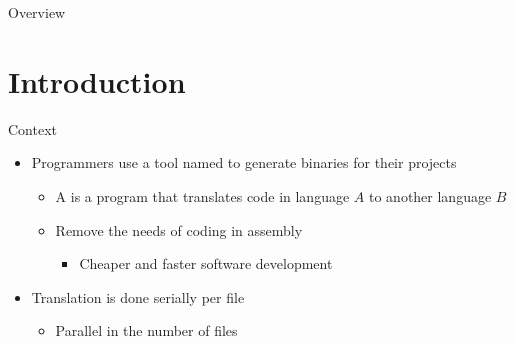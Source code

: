 

\customtitlepage

\showqrcode

\begin{frame}{Overview}
  \overview
\end{frame}

\section{Introduction}

\begin{frame}{Context}
  \begin{itemize}
    \item Programmers use a tool named {\color{red}{compiler}} to generate binaries for their projects
    \begin{itemize}
      \item A {\color{red}{compiler}} is a program that translates code in language $A$ to another language $B$
      \item Remove the needs of coding in assembly
      \begin{itemize}
        \item Cheaper and faster software development
      \end{itemize}
    \end{itemize}
    \item Translation is done serially per file
    \begin{itemize}
      \item Parallel in the number of files
    \end{itemize}
  \end{itemize}
\end{frame}


